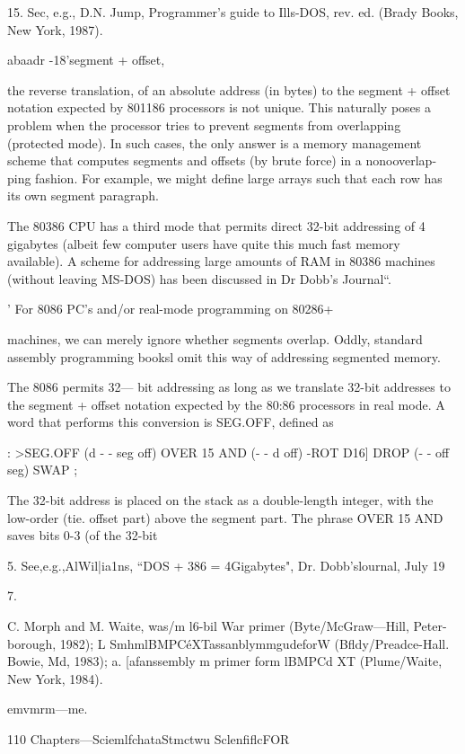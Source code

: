  

15. Sec, e.g., D.N. Jump, Programmer’s guide to Ills-DOS, rev. ed. (Brady Books, New York, 1987).

abaadr -18'segment + offset,

the reverse translation, of an absolute address (in bytes) to the
segment + offset notation expected by 801186 processors is not
unique. This naturally poses a problem when the processor tries
to prevent segments from overlapping (protected mode). In such
cases, the only answer is a memory management scheme that
computes segments and offsets (by brute force) in a nonooverlap-
ping fashion. For example, we might define large arrays such that
each row has its own segment paragraph.

The 80386 CPU has a third mode that permits direct 32-bit
addressing of 4 gigabytes (albeit few computer users have quite
this much fast memory available). A scheme for addressing large
amounts of RAM in 80386 machines (without leaving MS-DOS)
has been discussed in Dr Dobb’s Journal“.

' For 8086 PC's and/or real-mode programming on 80286+

machines, we can merely ignore whether segments overlap.
Oddly, standard assembly programming booksl omit this way of
addressing segmented memory.

The 8086 permits 32— bit addressing as long as we translate 32-bit
addresses to the segment + offset notation expected by the 80:86
processors in real mode. A word that performs this conversion is
SEG.OFF, defined as

: >SEG.OFF (d - - seg off)
OVER 15 AND (- - d off)
-ROT D16] DROP (- - off seg)
SWAP ;

The 32-bit address is placed on the stack as a double-length
integer, with the low-order (tie. offset part) above the segment
part. The phrase OVER 15 AND saves bits 0-3 (of the 32-bit

 

5. See,e.g.,AlWil|ia1ns, “DOS + 386 = 4Gigabytes", Dr. Dobb'slournal, July 19%

7.

C. Morph and M. Waite, was/m l6-bil War primer (Byte/McGraw—Hill, Peter-
borough, 1982); L SmhmlBMPCéXTassanblymmgudeforW
(Bfldy/Preadce-Hall. Bowie, Md, 1983); a. [afanssembly m primer form lBMPCd
XT (Plume/Waite, New York, 1984).

emvmrm—me.

110 Chapters—SciemlfchataStmctwu SclenfiflcFOR

